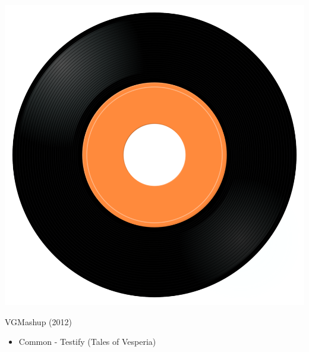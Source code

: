 \begin{minipage}[t]{0.25\textwidth}\vspace{0pt}
	\captionsetup{type=figure}
	\includegraphics[width=\textwidth]{Images/cover.png}
	\caption*{VGMashup (2012)}
\end{minipage}
\begin{minipage}[t]{0.25\textwidth}\vspace{0pt}
	\begin{itemize}[nosep,leftmargin=1em,labelwidth=*,align=left]
		\setlength{\itemsep}{0pt}
		\item Common - Testify (Tales of Vesperia)
	\end{itemize}
\end{minipage}
